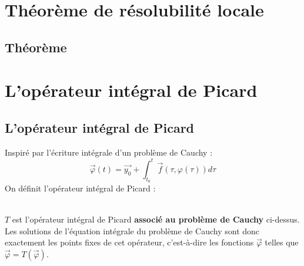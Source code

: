 	
\section{Théorème de résolubilité locale}
	\subsection{Théorème}


\newpage
\section{L'opérateur intégral de Picard}
	\subsection{L'opérateur intégral de Picard}
	Inspiré par l'écriture intégrale d'un problème de Cauchy :
	\begin{equation}
	\vec \varphi(t) = \vec{y_0} + \int_{t_0}^t \vec{f}(\tau,\varphi(\tau))d\tau
	\end{equation}
	On définit l'opérateur intégral de Picard :
	
	\ \\
	$T$ est l'opérateur intégral de Picard \textbf{associé au problème de Cauchy}
	ci-dessus. Les solutions de l'équation intégrale du problème de Cauchy sont donc 
	exactement les points fixes de cet opérateur, c'est-à-dire les fonctions 
	$\vec{\varphi}$ telles que $\vec \varphi = T(\vec \varphi)$.
	
	\setcounter{subsection}{8}
